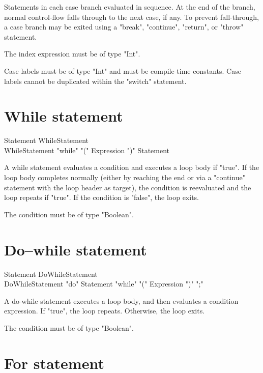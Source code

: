Statements in each case branch evaluated in sequence.  At the
end of the branch, normal control-flow falls through to the next case, if
any.  To prevent fall-through, a case branch may be exited using a \xcd"break",
\xcd"continue", \xcd"return", or \xcd"throw" statement.

The index expression must be of type \xcd"Int".

Case labels must be of type \xcd"Int" and must be compile-time
constants.  Case labels cannot be duplicated within the
\xcd"switch" statement.

\section{While statement}


\begin{grammar}
Statement \: WhileStatement \\
WhileStatement \: \xcd"while" \xcd"(" Expression \xcd")" Statement \\
\end{grammar}

A while statement evaluates a condition and executes a loop body
if \xcd"true".  If the loop body completes normally (either by reaching
the end or via a \xcd"continue" statement with the loop header
as target), the condition is reevaluated and the loop repeats if
\xcd"true".  If the condition is \xcd"false", the loop
exits.

The condition must be of type \xcd"Boolean".

\section{Do--while statement}


\begin{grammar}
Statement \: DoWhileStatement \\
DoWhileStatement \: \xcd"do" Statement \xcd"while" \xcd"(" Expression \xcd")" \xcd";" \\
\end{grammar}


A do-while statement executes a loop body, and then evaluates a
condition expression.  If \xcd"true", the loop repeats.
Otherwise, the loop exits.

The condition must be of type \xcd"Boolean".

\section{For statement}

